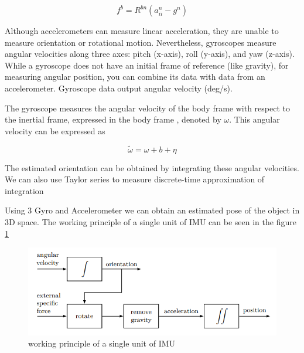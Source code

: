 \begin{equation}
f^{b}=R^{b n}\left(a_{i i}^{n}-g^{n}\right)
\end{equation}


Although accelerometers can measure linear acceleration, they are unable to measure orientation or rotational motion. Nevertheless, gyroscopes measure angular velocities along three axes: pitch (x-axis), roll (y-axis), and yaw (z-axis). While a gyroscope does not have an initial frame of reference (like gravity), for measuring angular position, you can combine its data with data from an accelerometer. Gyroscope data output angular velocity (deg/s).

The gyroscope measures the angular velocity of the body frame with respect to the inertial frame, expressed in the body frame \cite{ROS}, denoted by $\omega $. This angular velocity can be expressed as

\begin{equation}
\tilde{\omega}=\omega+b+\eta
\end{equation}

The estimated orientation can be obtained by integrating these angular velocities. We can also use Taylor series to measure discrete-time approximation of integration


Using 3 Gyro and Accelerometer we can obtain an estimated pose of the object in 3D space.
The working principle of a single unit of IMU can be seen in the figure \ref{fig:imuWP}


\begin{figure}[h]
  \centering
    \includegraphics[width=\linewidth]{figures/imuWP.png}
    \caption{ working principle of a single unit of IMU }
\label{fig:imuWP}
\end{figure}







